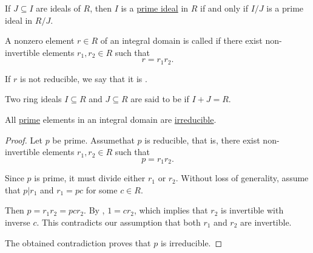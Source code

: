 \begin{proposition}\label{thm:prime_ideal_iff_prime_quotient_ideal}
  If \( J \subseteq I \) are ideals of \( R \), then \( I \) is a \hyperref[def:prime_ring_ideal]{prime ideal} in \( R \) if and only if \( I / J \) is a prime ideal in  \( R / J \).
\end{proposition}

\begin{definition}\label{def:irreducible_ring_element}
  A nonzero element \( r \in R \) of an integral domain is called  if there exist non-invertible elements \( r_1, r_2 \in R \) such that
  \begin{equation*}
    r = r_1 r_2.
  \end{equation*}

  If \( r \) is not reducible, we say that it is .
\end{definition}

\begin{definition}\label{def:coprime_ring_ideals}
  Two ring ideals \( I \subseteq R \) and \( J \subseteq R \) are said to be  if \( I + J = R \).
\end{definition}

\begin{proposition}\label{thm:prime_implies_irreducible}\mcite\cite[389]{Knapp2016BAlg}
  All \hyperref[def:prime_ring_ideal]{prime} elements in an integral domain are \hyperref[def:irreducible_ring_element]{irreducible}.
\end{proposition}
\begin{proof}
  Let \( p \) be prime. Assume\LEM that \( p \) is reducible, that is, there exist non-invertible elements \( r_1, r_2 \in R \) such that
  \begin{equation*}
    p = r_1 r_2.
  \end{equation*}

  Since \( p \) is prime, it must divide either \( r_1 \) or \( r_2 \). Without loss of generality, assume that \( p | r_1 \) and \( r_1 = pc \) for some \( c \in R \).

  Then \( p = r_1 r_2 = pc r_2 \). By , \( 1 = c r_2 \), which implies that \( r_2 \) is invertible with inverse \( c \). This contradicts our assumption that both \( r_1 \) and \( r_2 \) are invertible.

  The obtained contradiction proves that \( p \) is irreducible.
\end{proof}

